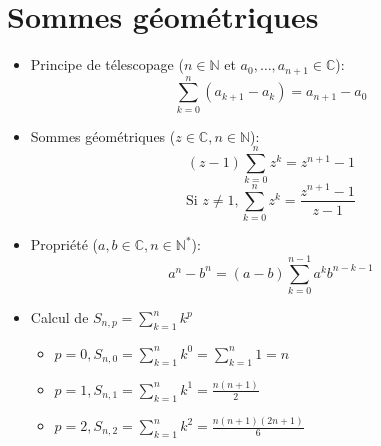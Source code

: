 \documentclass[fleqn]{article}
\theoremstyle{definition} \newtheorem*{defi}{D\'efinition}
\theoremstyle{definition} \newtheorem*{theo}{Th\'eor\`eme}
\theoremstyle{definition} \newtheorem*{prop}{Propri\'et\'e}
\begin{document}
\section{Sommes g\'eom\'etriques}
\begin{itemize}
	\item Principe de t\'elescopage (\(n \in \mathbb{N}\) et \(a_0, \hdots, a_{n+1} \in \mathbb{C}\)):
		\[\sum_{k=0}^{n} (a_{k+1} - a_k) = a_{n+1} - a_0\]
	\item Sommes g\'eom\'etriques (\(z \in \mathbb{C}, n \in \mathbb{N}\)):
		\[(z-1)\sum_{k=0}^{n}z^k = z^{n+1} -1\]
		\[\text{Si } z \neq 1, \sum_{k=0}^{n}z^k=\frac{z^{n+1}-1}{z-1}\]
	\item Propri\'{e}t\'{e} (\(a,b \in \mathbb{C}, n \in \mathbb{N}^*\)):
		\[a^n-b^n = (a-b)\sum_{k=0}^{n-1}a^kb^{n-k-1}\]
	\item Calcul de \(S_{n,p} = \sum_{k=1}^{n}k^p\)
		\begin{itemize}
			\item \(p = 0, S_{n,0} = \sum_{k=1}^{n}k^0 = \sum_{k=1}^{n}1 = n\)
			\item \(p = 1, S_{n,1} = \sum_{k=1}^{n}k^1 = \frac{n(n+1)}{2} \)
			\item \(p = 2, S_{n,2} = \sum_{k=1}^{n}k^2 = \frac{n(n+1)(2n+1)}{6} \)
		\end{itemize}
\end{itemize}
\end{document}

